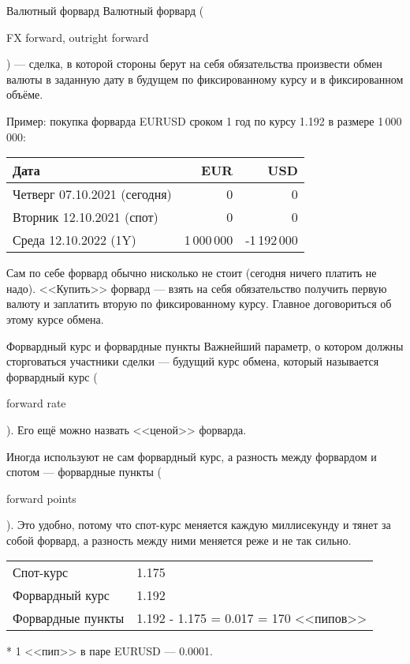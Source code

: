 \documentclass{beamer}
\newcommand{\en}[1]{\begin{otherlanguage}{english}#1\end{otherlanguage}}
\begin{document}
\begin{frame}{Валютный форвард}
\justify
\alert{Валютный форвард} (\en{FX forward, outright forward}) --- сделка, в которой стороны берут 
на себя обязательства произвести обмен валюты в заданную дату в будущем по 
фиксированному курсу и в фиксированном объёме. 

\justify
Пример: покупка форварда EURUSD сроком 1 год по курсу 1.192 в размере 1\,000\,000:

\centering
\begin{tabular}{l|r|r}
Дата                          & EUR & USD \\ \hline
Четверг 07.10.2021 (сегодня)  & 0   & 0   \\
Вторник 12.10.2021 (спот) & 0   & 0   \\
Среда   12.10.2022 (1Y)   & 1\,000\,000 & -1\,192\,000
\end{tabular}

\justify
Сам по себе форвард обычно нисколько не стоит (сегодня ничего платить не надо). <<Купить>> форвард --- взять на себя обязательство получить первую валюту и заплатить вторую по фиксированному курсу. Главное договориться об этому курсе обмена.
\end{frame}



\begin{frame}{Форвардный курс и форвардные пункты}
\justify
Важнейший параметр, о котором должны сторговаться участники сделки --- будущий курс обмена, который называется \alert{форвардный курс} (\en{forward rate}). Его ещё можно назвать <<ценой>> форварда.

\justify
Иногда используют не сам форвардный курс, а разность между форвардом и спотом --- \alert{форвардные пункты} (\en{forward points}). Это удобно, потому что спот-курс меняется каждую миллисекунду и тянет за собой форвард, а разность между ними меняется реже и не так сильно.

\vspace{\baselineskip}
\centering
\begin{tabular}{l|l}
Спот-курс & 1.175 \\
Форвардный курс & 1.192 \\
\hline
Форвардные пункты & 1.192 - 1.175 = 0.017 = 170 <<пипов>>
\end{tabular}

\justify
* 1 <<пип>> в паре EURUSD --- 0.0001.
\end{frame}
\end{document}
